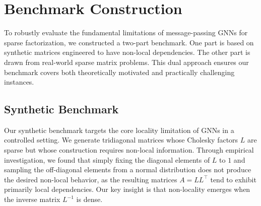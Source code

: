 \documentclass[10pt]{article} %
\theoremstyle{plain}
\theoremstyle{definition}
\theoremstyle{remark}
\begin{document}


\section{Benchmark Construction}

To robustly evaluate the fundamental limitations of message-passing GNNs for sparse factorization, we constructed a two-part benchmark. One part is based on synthetic matrices engineered to have non-local dependencies. The other part is drawn from real-world sparse matrix problems. This dual approach ensures our benchmark covers both theoretically motivated and practically challenging instances.

\subsection{Synthetic Benchmark}
\label{sec:synth_bench}

Our synthetic benchmark targets the core locality limitation of GNNs in a controlled setting. We generate tridiagonal matrices whose Cholesky factors $L$ are sparse but whose construction requires non-local information.
Through empirical investigation, we found that simply fixing the diagonal elements of $L$ to $1$ and sampling the off-diagonal elements from a normal distribution does not produce the desired non-local behavior, as the resulting matrices $A = LL^{\top}$ tend to exhibit primarily local dependencies. Our key insight is that non-locality emerges when the inverse matrix $L^{-1}$ is dense.
\end{document}
